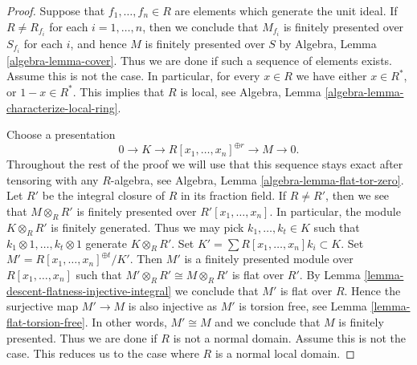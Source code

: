 \begin{proof}
Suppose that $f_1, \ldots, f_n \in R$ are elements which generate the
unit ideal. If $R \not = R_{f_i}$ for each $i = 1, \ldots, n$, then
we conclude that $M_{f_i}$ is finitely presented over
$S_{f_i}$ for each $i$, and hence $M$ is finitely presented over $S$ by
Algebra, Lemma \ref{algebra-lemma-cover}.
Thus we are done if such a sequence of elements exists.
Assume this is not the case. In particular, for every $x \in R$ we
have either $x \in R^*$, or $1 - x \in R^*$. This implies that $R$ is
local, see
Algebra, Lemma \ref{algebra-lemma-characterize-local-ring}.

\medskip\noindent
Choose a presentation
$$
0 \to K \to R[x_1, \ldots, x_n]^{\oplus r} \to M \to 0.
$$
Throughout the rest of the proof we will use that this sequence stays exact
after tensoring with any $R$-algebra, see
Algebra, Lemma \ref{algebra-lemma-flat-tor-zero}.
Let $R'$ be the integral closure of $R$ in its fraction field.
If $R \not = R'$, then we see that $M \otimes_R R'$ is finitely presented over
$R'[x_1, \ldots, x_n]$. In particular, the module $K \otimes_R R'$
is finitely generated. Thus we may pick $k_1, \ldots, k_t \in K$ such that
$k_1 \otimes 1, \ldots, k_t \otimes 1$ generate $K \otimes_R R'$.
Set $K' = \sum R[x_1, \ldots, x_n]k_i \subset K$. Set
$M' = R[x_1, \ldots, x_n]^{\oplus t}/K'$. Then $M'$ is a finitely presented
module over $R[x_1, \ldots, x_n]$ such that
$M' \otimes_R R' \cong M \otimes_R R'$ is flat over $R'$. By
Lemma \ref{lemma-descent-flatness-injective-integral}
we conclude that $M'$ is flat over $R$. Hence the surjective
map $M' \to M$ is also injective as $M'$ is torsion free, see
Lemma \ref{lemma-flat-torsion-free}.
In other words, $M' \cong M$ and we conclude that $M$ is finitely presented.
Thus we are done if $R$ is not a normal domain.
Assume this is not the case. This reduces us to the case where $R$ is
a normal local domain.


\end{proof}
